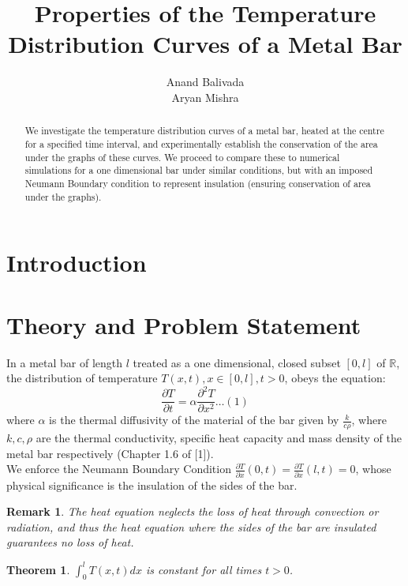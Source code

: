 \documentclass{article}
\newtheorem{theorem}{Theorem}[section]
\newtheorem*{remark}{Remark}
\begin{document}
\title{Properties of the Temperature Distribution Curves of a Metal Bar}
\author{Anand Balivada \\ Aryan Mishra}
\maketitle

\begin{abstract}
 We investigate the temperature distribution curves of a metal bar, heated at the centre for a specified time interval, and experimentally establish the conservation of the area under the graphs of these curves. We proceed to compare these to numerical simulations for a one dimensional bar under similar conditions, but with an imposed Neumann Boundary condition to represent insulation (ensuring conservation of area under the graphs). 
\end{abstract}

\tableofcontents

\section{Introduction}


\section{Theory and Problem Statement}
In a metal bar of length $l$ treated as a one dimensional, closed subset $[0,l]$ of $\mathbb{R}$, the distribution of temperature $T(x, t), x \in [0,l], t > 0$, obeys the equation: $$\frac{\partial T}{\partial t} = \alpha\frac{\partial^{2}T}{\partial x^{2}} \dots (1)$$
where $\alpha$ is the thermal diffusivity of the material of the bar given by $\frac{k}{c\rho}$, where $k,c,\rho$ are the thermal conductivity, specific heat capacity and mass density of the metal bar respectively (Chapter 1.6 of [1]). \\ 
We enforce the Neumann Boundary Condition $\frac{\partial T}{\partial x}(0,t) = \frac{\partial T}{\partial x}(l,t)  = 0$, whose physical significance is the insulation of the sides of the bar. 
\begin{remark}
The heat equation neglects the loss of heat through convection or radiation, and thus the heat equation where the sides of the bar are insulated guarantees no loss of heat.
\end{remark}
\begin{theorem}
$\int_{0}^{l} T(x,t) dx$ is constant for all times $t > 0$. 
\end{theorem}
\end{document}
